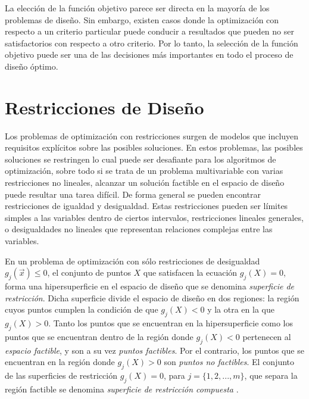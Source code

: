 La elección de la función objetivo parece ser directa en la mayoría de los problemas de diseño. Sin embargo, existen casos donde la optimización con respecto a un criterio particular puede conducir a resultados que pueden no ser satisfactorios con respecto a otro criterio. Por lo tanto, la selección de la función objetivo puede ser una de las decisiones más importantes en todo el proceso de diseño óptimo. 

\section{Restricciones de Diseño}
Los problemas de optimización con restricciones surgen de modelos que incluyen requisitos explícitos sobre las posibles soluciones. En estos problemas, las posibles soluciones se restringen lo cual puede ser desafiante para los algoritmos de optimización, sobre todo si se trata de un problema multivariable con varias restricciones no lineales, alcanzar un solución factible en el espacio de diseño puede resultar una tarea difícil. De forma general se pueden encontrar restricciones de igualdad y desigualdad. Estas restricciones pueden ser límites simples a las variables dentro de ciertos intervalos, restricciones lineales generales, o desigualdades no lineales que representan relaciones complejas entre las variables. 

En un problema de optimización con sólo restricciones de desigualdad $g_j (\vec{x}) \leq 0$, el conjunto de puntos $X$ que satisfacen la ecuación $g_j (X) = 0$, forma una hipersuperficie en el espacio de diseño que se denomina \textit{superficie de restricción}. Dicha superficie  divide el espacio de diseño en dos regiones: la región cuyos  puntos cumplen la condición de que $g_j (X) <0$ y la otra en la que $g_j (X)> 0$. Tanto los puntos que se encuentran en la hipersuperficie como los puntos que se encuentran dentro de la región donde $g_j (X) <0$  pertenecen al \textit{espacio factible}, y son a su vez \textit{puntos factibles}. Por el contrario, los puntos que se encuentran en la región donde $g_j (X)> 0$ son \textit{puntos no factibles}. El conjunto de las superficies de restricción $g_j (X) = 0$, para $j = \{1,2, ..., m\}$, que separa la región factible se denomina \textit{superficie de restricción compuesta} \cite{rao_engineering_2009}.

